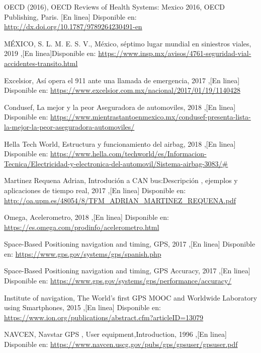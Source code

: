 \begin{thebibliography}{50}
	
	 OECD (2016), OECD Reviews of Health Systems: Mexico 2016, OECD Publishing, Paris. [En linea] Disponible en: \url{http://dx.doi.org/10.1787/9789264230491-en}

	 MÉXICO, S. L. M. E. S. V., México, séptimo lugar mundial en siniestros viales, 2019 ,[En linea]Disponible en: \url{https://www.insp.mx/avisos/4761-seguridad-vial-accidentes-transito.html}

	 Excelsior, Así opera el 911 ante una llamada de emergencia, 2017 ,[En linea] Disponible en: \url{https://www.excelsior.com.mx/nacional/2017/01/19/1140428}

	 Condusef, La mejor y la peor Aseguradora de automoviles, 2018 ,[En linea] Disponible en: \url{https://www.mientrastantoenmexico.mx/condusef-presenta-lista-la-mejor-la-peor-aseguradora-automoviles/}

	 Hella Tech World, Estructura y funcionamiento del airbag, 2018 ,[En linea] Disponible en: \url{https://www.hella.com/techworld/es/Informacion-Tecnica/Electricidad-y-electronica-del-automovil/Sistema-airbag-3083/#}

	 Martinez Requena Adrian, Introdución a CAN bus:Descripción , ejemplos y aplicaciones de tiempo real, 2017 ,[En linea] Disponible en: \url{http://oa.upm.es/48054/8/TFM_ADRIAN_MARTINEZ_REQUENA.pdf}

	 Omega, Acelerometro, 2018 ,[En linea] Disponible en: \url{https://es.omega.com/prodinfo/acelerometro.html}

	 Space-Based Positioning navigation and timing, GPS, 2017 ,[En linea] Disponible en: \url{https://www.gps.gov/systems/gps/spanish.php}

	 Space-Based Positioning navigation and timing, GPS Accuracy, 2017 ,[En linea] Disponible en: \url{https://www.gps.gov/systems/gps/performance/accuracy/}

	 Institute of navigation, The World’s first GPS MOOC and Worldwide Laboratory using Smartphones, 2015 ,[En linea] Disponible en: \url{https://www.ion.org/publications/abstract.cfm?articleID=13079}

	 NAVCEN, Navstar GPS , User equipment,Introduction, 1996 ,[En linea] Disponible en: \url{https://www.navcen.uscg.gov/pubs/gps/gpsuser/gpsuser.pdf}


\end{thebibliography}
